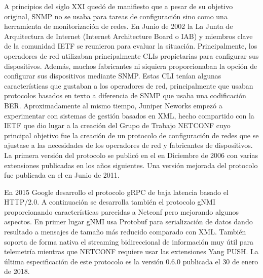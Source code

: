 A principios del siglo XXI quedó de manifiesto que a pesar de su objetivo original, SNMP no se usaba para
tareas de configuración sino como una herramienta de monitorización de redes. En Junio de 2002 la La Junta
de Arquitectura de Internet (Internet Architecture Board o IAB) y miembros clave de la comunidad \gls{IETF}
se reunieron para evaluar la situación. Principalmente, los operadores de red utilizaban principalmente \glspl{CLI} propietarias para configurar sus
dispositivos. Además, muchos fabricantes ni siquiera proporcionaban la opción de configurar sus dispositivos
mediante SNMP. Estas \ac{CLI} tenían algunas características que gustaban a los operadores de red,
principalmente que usaban protocolos basados en texto a diferencia de \ac{SNMP} que usaba una codificación BER.
Aproximadamente al mismo tiempo, Juniper Neworks empezó a experimentar con sistemas de gestión basados en
\ac{XML}, hecho compartido con la \ac{IETF} que dio lugar a la creación del Grupo de Trabajo NETCONF cuyo
principal objetivo fue la creación de un protocolo de configuración de redes que se ajustase a las necesidades
de los operadores de red y fabricantes de dispositivos. La primera versión del protocolo se publicó en el
 en Diciembre de 2006 con varias extensiones publicadas en los años siguientes. Una versión
mejorada del protocolo fue publicada en el  en Junio de 2011.

En 2015 Google desarrollo el protocolo \ac{gRPC} de baja latencia basado el \ac{HTTP}/2.0. A continuación 
se desarrolla también el protocolo \ac{gNMI} proporcionando características parecidas a Netconf pero 
mejorando algunos aspectos. En primer lugar \ac{gNMI} usa Protobuf para serialización de datos dando resultado 
a mensajes de tamaño más reducido comparado con \ac{XML}. También soporta de forma nativa el streaming 
bidireccional de información muy útil para telemetría mientras que \ac{NETCONF} requiere usar las extensiones 
Yang PUSH. La última especificación de este protocolo es la versión 0.6.0 publicada el 30 de enero de 2018. 


% 

% 

% 